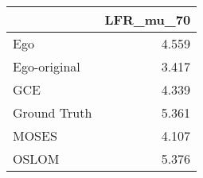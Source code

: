 \begin{tabular}{lr}
\toprule
{} & LFR_mu_70 \\
\midrule
Ego          &     4.559 \\
Ego-original &     3.417 \\
GCE          &     4.339 \\
Ground Truth &     5.361 \\
MOSES        &     4.107 \\
OSLOM        &     5.376 \\
\bottomrule
\end{tabular}
